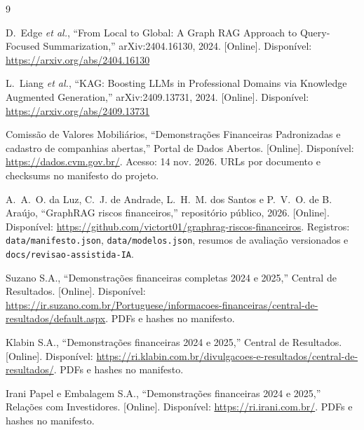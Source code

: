 \documentclass[conference]{IEEEtran}
\begin{document}
\begin{thebibliography}{9}

D.~Edge \emph{et al.}, ``From Local to Global: A Graph RAG Approach to Query-Focused Summarization,'' arXiv:2404.16130, 2024. [Online]. Disponível: \url{https://arxiv.org/abs/2404.16130}

L.~Liang \emph{et al.}, ``KAG: Boosting LLMs in Professional Domains via Knowledge Augmented Generation,'' arXiv:2409.13731, 2024. [Online]. Disponível: \url{https://arxiv.org/abs/2409.13731}

Comissão de Valores Mobiliários, ``Demonstrações Financeiras Padronizadas e cadastro de companhias abertas,'' Portal de Dados Abertos. [Online]. Disponível: \url{https://dados.cvm.gov.br/}. Acesso: 14 nov. 2026. URLs por documento e checksums no manifesto do projeto.

A.~A.~O. da Luz, C.~J. de Andrade, L.~H.~M. dos Santos e P.~V.~O. de B. Araújo, ``GraphRAG riscos financeiros,'' repositório público, 2026. [Online]. Disponível: \url{https://github.com/victort01/graphrag-riscos-financeiros}. Registros: \texttt{data/manifesto.json}, \texttt{data/modelos.json}, resumos de avaliação versionados e \texttt{docs/revisao-assistida-IA}.

Suzano S.A., ``Demonstrações financeiras completas 2024 e 2025,'' Central de Resultados. [Online]. Disponível: \url{https://ir.suzano.com.br/Portuguese/informacoes-financeiras/central-de-resultados/default.aspx}. PDFs e hashes no manifesto.

Klabin S.A., ``Demonstrações financeiras 2024 e 2025,'' Central de Resultados. [Online]. Disponível: \url{https://ri.klabin.com.br/divulgacoes-e-resultados/central-de-resultados/}. PDFs e hashes no manifesto.

Irani Papel e Embalagem S.A., ``Demonstrações financeiras 2024 e 2025,'' Relações com Investidores. [Online]. Disponível: \url{https://ri.irani.com.br/}. PDFs e hashes no manifesto.

\end{thebibliography}
\end{document}

